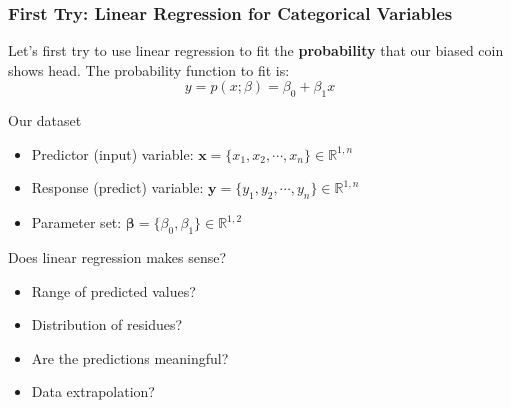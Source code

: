 \documentclass[10pt,aspectratio=169]{beamer}
\begin{document}
\begin{frame}
  \frametitle{First Try: Linear Regression for Categorical Variables}

  Let's first try to use linear regression to fit the
  \textbf{probability} that our biased coin shows head. The
  probability function to fit is:
  \begin{equation*}
    y = p(x; \mathbb{\beta}) = \beta_{0} + \beta_{1} x
  \end{equation*}

  \vfill Our dataset
  \begin{itemize}
  \item Predictor (input) variable:
    $\mathbf{x} = \{x_{1}, x_{2}, \cdots, x_{n}\} \in \mathbb{R}^{1,
      n}$
  \item Response (predict) variable:
    $\mathbf{y} = \{y_{1}, y_{2}, \cdots, y_{n}\} \in \mathbb{R}^{1,
      n}$
  \item Parameter set:
    $\mathbf{\beta} = \{\beta_{0}, \beta_{1}\} \in \mathbb{R}^{1, 2}$
  \end{itemize}

  \vfill Does linear regression makes sense?
  \begin{itemize}
  \item Range of predicted values?
  \item Distribution of residues?
  \item Are the predictions meaningful?
  \item Data extrapolation?
  \end{itemize}
\end{frame}
\end{document}
